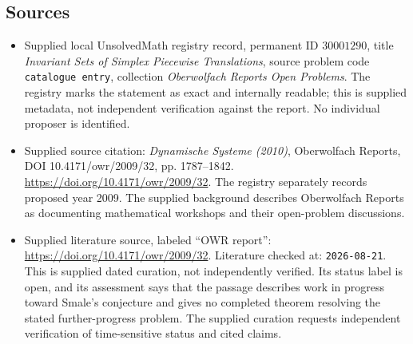 \documentclass[11pt]{article}
\begin{document}
\subsection{Sources}
\begin{itemize}
\item Supplied local UnsolvedMath registry record, permanent ID \(30001290\), title \emph{Invariant Sets of Simplex Piecewise Translations}, source problem code \texttt{catalogue entry}, collection \emph{Oberwolfach Reports Open Problems}. The registry marks the statement as exact and internally readable; this is supplied metadata, not independent verification against the report. No individual proposer is identified.
\item Supplied source citation: \emph{Dynamische Systeme (2010)}, Oberwolfach Reports, DOI 10.4171/owr/2009/32, pp. 1787--1842. \url{https://doi.org/10.4171/owr/2009/32}. The registry separately records proposed year 2009. The supplied background describes Oberwolfach Reports as documenting mathematical workshops and their open-problem discussions.
\item Supplied literature source, labeled ``OWR report'': \url{https://doi.org/10.4171/owr/2009/32}. Literature checked at: \texttt{2026-08-21}. This is supplied dated curation, not independently verified. Its status label is open, and its assessment says that the passage describes work in progress toward Smale's conjecture and gives no completed theorem resolving the stated further-progress problem. The supplied curation requests independent verification of time-sensitive status and cited claims.
\end{itemize}
\end{document}
